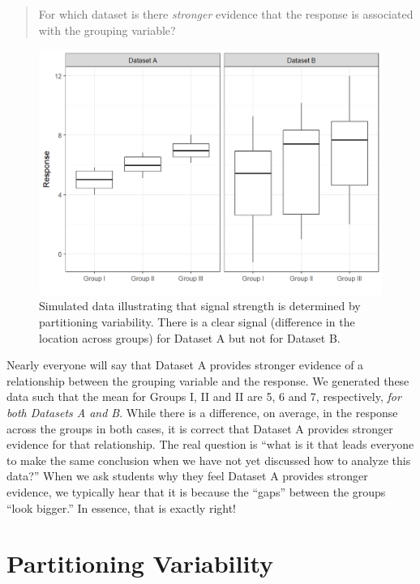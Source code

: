 \documentclass[]{book}
\theoremstyle{definition}
\theoremstyle{definition}
\theoremstyle{definition}
\theoremstyle{remark}
\begin{document}
\begin{quote}
For which dataset is there \emph{stronger} evidence that the response is
associated with the grouping variable?
\end{quote}

\begin{figure}

{\centering \includegraphics[width=0.8\linewidth]{./Images/anovateststat-boxplots-1} 

}

\caption{Simulated data illustrating that signal strength is determined by partitioning variability. There is a clear signal (difference in the location across groups) for Dataset A but not for Dataset B.}\label{fig:anovateststat-boxplots}
\end{figure}

Nearly everyone will say that Dataset A provides stronger evidence of a
relationship between the grouping variable and the response. We
generated these data such that the mean for Groups I, II and II are 5, 6
and 7, respectively, \emph{for both Datasets A and B}. While there is a
difference, on average, in the response across the groups in both cases,
it is correct that Dataset A provides stronger evidence for that
relationship. The real question is ``what is it that leads everyone to
make the same conclusion when we have not yet discussed how to analyze
this data?'' When we ask students why they feel Dataset A provides
stronger evidence, we typically hear that it is because the ``gaps''
between the groups ``look bigger.'' In essence, that is exactly right!

\section{Partitioning Variability}\label{partitioning-variability}
\end{document}
